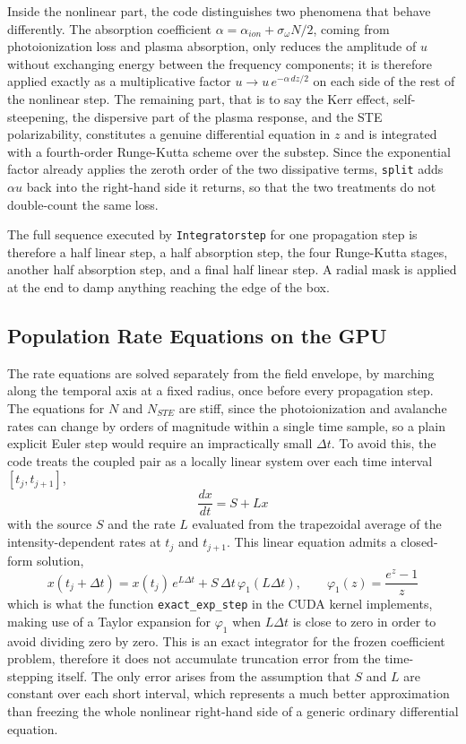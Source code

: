 Inside the nonlinear part, the code distinguishes two phenomena that behave differently. The absorption coefficient $\alpha=\alpha_{ion}+\sigma_\omega N/2$, coming from photoionization loss and plasma absorption, only reduces the amplitude of $u$ without exchanging energy between the frequency components; it is therefore applied exactly as a multiplicative factor $u \to u\,e^{-\alpha\,dz/2}$ on each side of the rest of the nonlinear step. The remaining part, that is to say the Kerr effect, self-steepening, the dispersive part of the plasma response, and the STE polarizability, constitutes a genuine differential equation in $z$ and is integrated with a fourth-order Runge-Kutta scheme over the substep. Since the exponential factor already applies the zeroth order of the two dissipative terms, \texttt{split} adds $\alpha u$ back into the right-hand side it returns, so that the two treatments do not double-count the same loss.

The full sequence executed by \texttt{Integrator\dotb step} for one propagation step is therefore a half linear step, a half absorption step, the four Runge-Kutta stages, another half absorption step, and a final half linear step. A radial mask is applied at the end to damp anything reaching the edge of the box.

\subsection{Population Rate Equations on the GPU}

The rate equations are solved separately from the field envelope, by marching along the temporal axis at a fixed radius, once before every propagation step. The equations for $N$ and $N_{STE}$ are stiff, since the photoionization and avalanche rates can change by orders of magnitude within a single time sample, so a plain explicit Euler step would require an impractically small $\Delta t$. To avoid this, the code treats the coupled pair as a locally linear system over each time interval $[t_j,t_{j+1}]$,
\begin{equation}
\frac{dx}{dt} = S + Lx
\end{equation}
with the source $S$ and the rate $L$ evaluated from the trapezoidal average of the intensity-dependent rates at $t_j$ and $t_{j+1}$. This linear equation admits a closed-form solution,
\begin{equation}
x(t_j+\Delta t) = x(t_j)\,e^{L\Delta t} + S\,\Delta t\,\varphi_1(L\Delta t), \qquad \varphi_1(z) = \frac{e^z-1}{z}
\end{equation}
which is what the function \texttt{exact\_exp\_step} in the CUDA kernel implements, making use of a Taylor expansion for $\varphi_1$ when $L\Delta t$ is close to zero in order to avoid dividing zero by zero. This is an exact integrator for the frozen coefficient problem, therefore it does not accumulate truncation error from the time-stepping itself. The only error arises from the assumption that $S$ and $L$ are constant over each short interval, which represents a much better approximation than freezing the whole nonlinear right-hand side of a generic ordinary differential equation.

